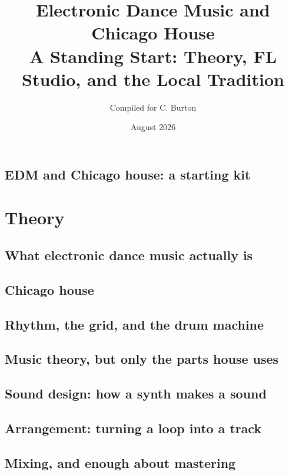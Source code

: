 \documentclass[11pt,letterpaper,oneside]{book}
\title{\textbf{Electronic Dance Music and Chicago House}\\[0.35em]
  \large A Standing Start: Theory, FL Studio, and the Local Tradition}
\author{\normalsize Compiled for C. Burton}
\date{\normalsize August 2026}
\begin{document}
\maketitle
\tableofcontents

\chapter{EDM and Chicago house: a starting kit}


\part{Theory}
\chapter{What electronic dance music actually is}


\chapter{Chicago house}


\chapter{Rhythm, the grid, and the drum machine}


\chapter{Music theory, but only the parts house uses}


\chapter{Sound design: how a synth makes a sound}


\chapter{Arrangement: turning a loop into a track}


\chapter{Mixing, and enough about mastering}

\end{document}
